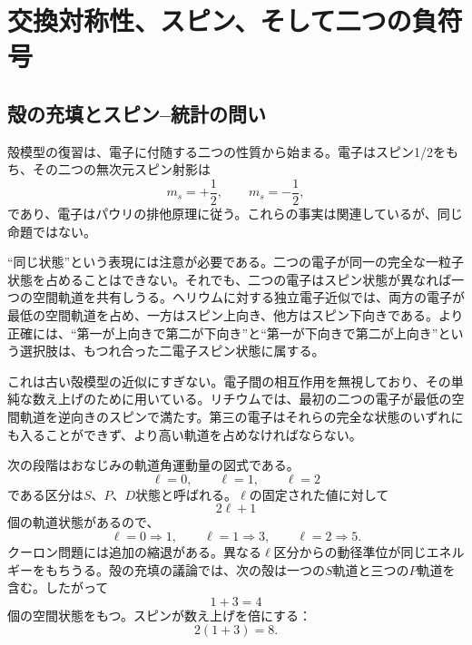 \chapter{交換対称性、スピン、そして二つの負符号}

\section{殻の充填とスピン--統計の問い}

殻模型の復習は、電子に付随する二つの性質から始まる。電子はスピン1/2をもち、その二つの無次元スピン射影は
\begin{equation}
m_s=+\frac12,
\qquad
m_s=-\frac12,
\end{equation}
であり、電子はパウリの排他原理に従う。これらの事実は関連しているが、同じ命題ではない。

``同じ状態''という表現には注意が必要である。二つの電子が同一の完全な一粒子状態を占めることはできない。それでも、二つの電子はスピン状態が異なれば一つの空間軌道を共有しうる。ヘリウムに対する独立電子近似では、両方の電子が最低の空間軌道を占め、一方はスピン上向き、他方はスピン下向きである。より正確には、``第一が上向きで第二が下向き''と``第一が下向きで第二が上向き''という選択肢は、もつれ合った二電子スピン状態に属する。

これは古い殻模型の近似にすぎない。電子間の相互作用を無視しており、その単純な数え上げのために用いている。リチウムでは、最初の二つの電子が最低の空間軌道を逆向きのスピンで満たす。第三の電子はそれらの完全な状態のいずれにも入ることができず、より高い軌道を占めなければならない。

次の段階はおなじみの軌道角運動量の図式である。
\begin{equation}
\ell=0,\qquad \ell=1,\qquad \ell=2
\end{equation}
である区分は\(S\)、\(P\)、\(D\)状態と呼ばれる。\(\ell\)の固定された値に対して
\begin{equation}
2\ell+1
\end{equation}
個の軌道状態があるので、
\begin{equation}
\ell=0\Rightarrow 1,
\qquad
\ell=1\Rightarrow 3,
\qquad
\ell=2\Rightarrow 5.
\end{equation}
クーロン問題には追加の縮退がある。異なる\(\ell\)区分からの動径準位が同じエネルギーをもちうる。殻の充填の議論では、次の殻は一つの\(S\)軌道と三つの\(P\)軌道を含む。したがって
\begin{equation}
1+3=4
\end{equation}
個の空間状態をもつ。スピンが数え上げを倍にする：
\begin{equation}
2(1+3)=8.
\end{equation}

